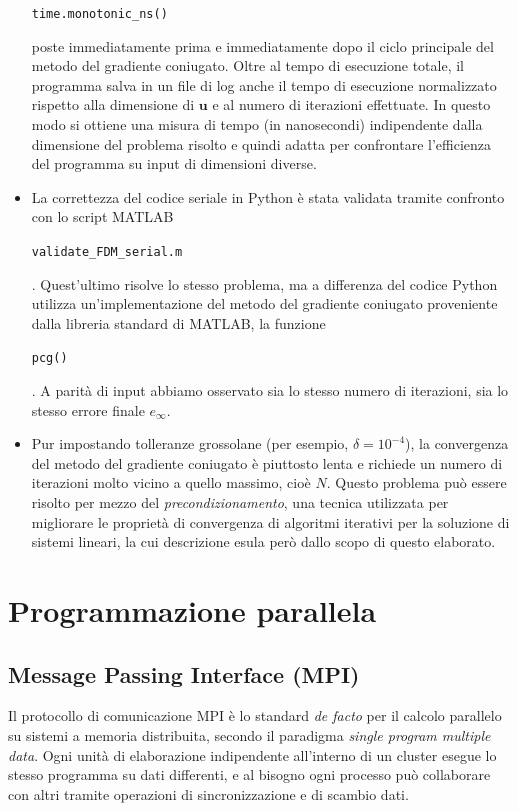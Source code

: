 \documentclass[a4paper,11pt]{article}
\renewcommand{\vec}[1]{\bm{#1}}
\newcommand{\code}[1]{\begin{small}\texttt{#1}\end{small}}
\begin{document}
\begin{itemize}
\code{time.monotonic\_ns()} poste immediatamente prima e
immediatamente dopo il ciclo
principale del metodo del gradiente coniugato.
Oltre al tempo di esecuzione totale, il programma salva in un file
di log anche il tempo di esecuzione normalizzato rispetto
alla dimensione di $\vec{u}$ e al numero di iterazioni
effettuate. In questo modo si ottiene una misura di tempo
(in nanosecondi) indipendente dalla dimensione del problema
risolto e quindi adatta per confrontare l'efficienza del
programma su input di dimensioni diverse.
\item La correttezza del codice seriale in Python è stata validata
tramite confronto con lo script MATLAB \code{validate\_FDM\_serial.m}.
Quest'ultimo risolve lo stesso problema, ma a differenza del
codice Python utilizza un'implementazione del metodo del gradiente
coniugato proveniente dalla libreria standard di MATLAB,
la funzione \code{pcg()}.
A parità di input abbiamo osservato sia lo stesso
numero di iterazioni, sia lo stesso errore finale $e_\infty$.
\item Pur impostando tolleranze grossolane
(per esempio, $\delta = 10^{-4}$), la convergenza del metodo
del gradiente coniugato è piuttosto lenta e richiede
un numero di iterazioni molto vicino a quello massimo, cioè $N$.
Questo problema può essere risolto per mezzo del
\emph{precondizionamento}, una tecnica utilizzata
per migliorare le proprietà di convergenza di algoritmi
iterativi per la soluzione di sistemi lineari, la cui
descrizione esula però dallo scopo di questo elaborato.
\end{itemize}

\section{Programmazione parallela}
\subsection{Message Passing Interface (MPI)}
Il protocollo di comunicazione MPI è lo standard \emph{de facto}
per il calcolo parallelo su sistemi a memoria distribuita,
secondo il paradigma \emph{single program multiple data}.
Ogni unità di elaborazione indipendente all'interno di un
cluster esegue lo stesso programma su dati differenti,
e al bisogno ogni processo può collaborare con altri
tramite operazioni di sincronizzazione e di scambio dati.
\end{document}
